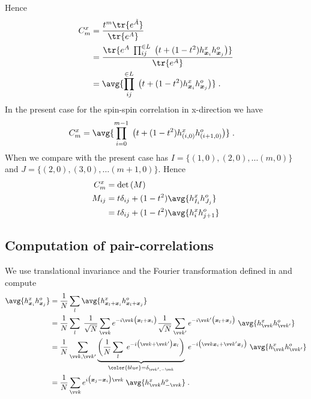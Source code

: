 %
Hence
%
\begin{align*}
C^{x}_{m} &= \frac{t^{m}\tr{ e^{\tilde A}}}{\tr{e^{A}}}\\
&=\frac{\tr{ e^{A}\;
\prod_{ij}^{\in L}\;
\big(t + (1-t^{2})\hdag{\xx{i}} \hnag{\xx{j}} \big)
}}{\tr{e^{A}}} \\
&=\avg{
\prod_{ij}^{\in L}\;
\big(t + (1-t^{2})\hdag{\xx{i}} \hnag{\xx{j}} \big)
} \;.
\end{align*}
%
In the present case for the spin-spin correlation in x-direction we have
\begin{align*}
C^{x}_{m} 
&=\avg{
\prod_{i=0}^{m-1}\;
\big(t + (1-t^{2})\hdag{(i,0)} \hnag{(i+1,0)} \big)
} \;.
\end{align*}
%
%
When we compare with  the present case has
$I = \{(1,0),(2,0),\ldots(m,0)\}$
and $J=\{(2,0),(3,0),\ldots(m+1,0)\}$.
Hence
%
\begin{align}\label{eq:}
C^{x}_{m}&=\Det{M}\\
M_{ij} &= t \delta_{ij}  +(1-t^{2})
\avg{\hdag{I_{i}} \hnag{J_{j}}}\\
&= t \delta_{ij}  +(1-t^{2})
\avg{\hdag{i} \hnag{j+1}}\\
\end{align}
%

\subsection{Computation of pair-correlations}

We use translational invariance and the Fourier transformation defined in  and compute
%
\begin{align*}
\avg{\hdag{\xx{i}} \hnag{\xx{j}}}
&=\frac{1}{N}\sum_{l}\avg{\hdag{\xx{l}+\xx{i}} \hnag{  \xx{l} + \xx{j}}}\\ 
&=\frac{1}{N}\sum_{l}\;
\frac{1}{\sqrt{N}} \sum_{ \vv k}  e^{-i\vv k \big(\xx{l}+\xx{i}\big)}
\frac{1}{\sqrt{N}} \sum_{ \vv k'}
e^{-i \vv k' \big(\xx{l} +\xx{j}\big)}\;
\avg{\hdag{\vv k} \hnag{ \vv k'}}\\
&=\frac{1}{N}
\sum_{ \vv k, \vv k'}
\underbrace{
\bigg(\frac{1}{N}\sum_{l}\;
e^{-i \big(\vv k + \vv k'\big) \xx{l} }\bigg)
}_{\color{blue} = \delta_{\vv k', -\vv k}}\;
e^{-i\big(\vv k \xx{i} + \vv k' \xx{j}\big)}\;
\avg{\hdag{\vv k} \hnag{ \vv k'}}\\
&=\frac{1}{N}
\sum_{ \vv k}
e^{i\big(\xx{j} -  \xx{i}\big)\vv k}\;
\avg{\hdag{\vv k} \hnag{- \vv k}}\;.
\end{align*}

